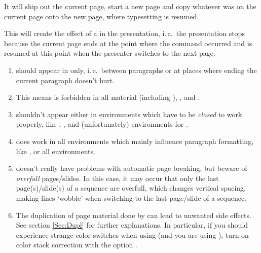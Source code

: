   It will ship out the current page, start a new page and copy whatever was on the current page onto the new page, where
  typesetting is resumed.

  \pause

  This will create the effect of a  in the presentation, i.\,e.\ the presentation stops because the
  current page ends at the point where the  command occurred and is resumed at this point when the
  presenter switches to the next page. 

  \newslide

  \begin{enumerate}
  \item {} should appear in  only, i.\,e.\ between paragraphs or at places where
    ending the current paragraph doesn't hurt.
    
  \item This means  is forbidden in all  material (including ),
    , and .

  \item {} shouldn't appear either in environments which have to be \emph{closed} to work properly, like
    , , and (unfortunately) environments for .

  \item {} does work in all environments which mainly influence paragraph formatting, like ,
     or all  environments.

    \newslide

  \item {} doesn't really have problems with automatic page breaking, but beware of \emph{overfull}
    pages/slides. In this case, it may occur that only the last page(s)/slide(s) of a sequence are overfull, which
    changes vertical spacing, making lines `wobble' when switching to the last page/slide of a sequence.
    
    \newslide
    
  \item The duplication of page material done by  can lead to unwanted side effects. See section
    \ref{Sec:Dupl} for further explanations. In particular, if you should experience strange color switches when using
     (and you are  using ), turn on color stack correction with the option
    .

  \end{enumerate}

